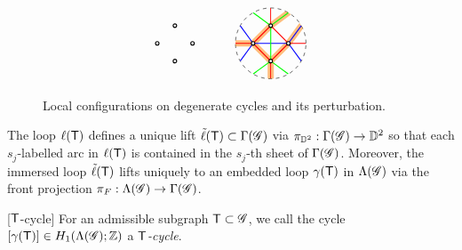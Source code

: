 \begin{figure}
\[\begin{tikzcd}
\begin{tikzpicture}[baseline=-.5ex]
\draw[thick,black,fill=white] (-1/2,0) circle (0.05);
\draw[thick,black,fill=white] (1/2,0) circle (0.05);

\draw[thick,black,fill=white] (0,1/2) circle (0.05);
\draw[thick,black,fill=white] (0,-1/2) circle (0.05);
\end{tikzpicture}
&
\begin{tikzpicture}[baseline=-.5ex]
\draw [dashed] (0,0) circle [radius=1];
\clip (0,0) circle (1);
\draw [color=cyclecolor1, line cap=round, line width=5, opacity=0.5] 
(180:1)--(180:1/2)--(90:1/2)--(60:1) 
(180:1/2) --(270:1/2)--(0:1/2)--(30:1) (270:1/2)--(270:1);

\draw [blue, thick] ({-sqrt(3)/2},1/2)--(-1/2,0);
\draw [blue, thick] ({-sqrt(3)/2},-1/2)--(-1/2,0);
\draw [blue, thick] ({sqrt(3)/2},1/2)--(1/2,0);
\draw [blue, thick] ({sqrt(3)/2},-1/2)--(1/2,0);
\draw [blue, thick] (-1/2,0)--(1/2,0);

\draw [red, thick] (-1,0)--(-1/2,0) to (0,1/2) to (1/2,0)--(1,0);
\draw [red, thick] (-1/2,0) to (0, -1/2) to (1/2,0); 
\draw [red, thick] (0,1) to (0,1/2);
\draw [red, thick] (0,-1) to (0,-1/2);

\draw [green, thick] (-1/2,{sqrt(3)/2}) to (0,1/2) to (0,-1/2) to (-1/2,-{sqrt(3)/2});
\draw [green, thick] (1/2,{sqrt(3)/2})--(0,1/2);
\draw [green, thick] (1/2,-{sqrt(3)/2})--(0,-1/2);


\draw[thick,black,fill=white] (-1/2,0) circle (0.05);
\draw[thick,black,fill=white] (1/2,0) circle (0.05);

\draw[thick,black,fill=white] (0,1/2) circle (0.05);
\draw[thick,black,fill=white] (0,-1/2) circle (0.05);
\end{tikzpicture}
\end{tikzcd}
\]
\caption{Local configurations on degenerate cycles and its perturbation.}
\label{figure:perturbation of admissible subgraphs}
\end{figure}

The loop $\ell(\mathsf{T})$ defines a unique lift $\tilde\ell(\mathsf{T})\subset\Gamma(\mathscr{G})$ via $\pi_{\mathbb{D}^2}:\Gamma(\mathscr{G})\to\mathbb{D}^2$ so that each $s_j$-labelled arc in $\ell(\mathsf{T})$ is contained in the $s_j$-th sheet of $\Gamma(\mathscr{G})$.
Moreover, the immersed loop $\tilde\ell(\mathsf{T})$ lifts uniquely to an embedded loop $\gamma(\mathsf{T})$ in $\Lambda(\mathscr{G})$ via the front projection $\pi_F:\Lambda(\mathscr{G})\to\Gamma(\mathscr{G})$.

\begin{definition}\label{def:one-cycles}[$\mathsf{T}$-cycle]
For an admissible subgraph $\mathsf{T}\subset\mathscr{G}$, we call the cycle $[\gamma(\mathsf{T})]\in H_1(\Lambda(\mathscr{G});\mathbb{Z})$ a \emph{$\mathsf{T}$-cycle}.
\end{definition}

